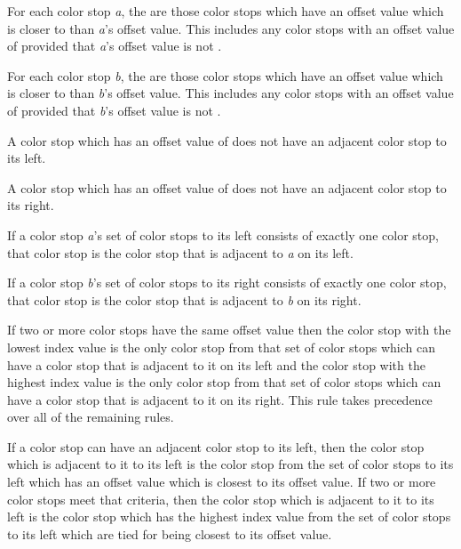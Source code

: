 \begin{enumeratea}
\item For each color stop \textit{a}, the  are those color stops which have an offset value which is closer to  than \textit{a}'s offset value.
\enternote
This includes any color stops with an offset value of  provided that \textit{a}'s offset value is not .
\exitnote

\item For each color stop \textit{b}, the  are those color stops which have an offset value which is closer to  than \textit{b}'s offset value.
\enternote
This includes any color stops with an offset value of  provided that \textit{b}'s offset value is not .
\exitnote

\item A color stop which has an offset value of  does not have an adjacent color stop to its left.

\item A color stop which has an offset value of  does not have an adjacent color stop to its right.

\item If a color stop \textit{a}'s set of color stops to its left consists of exactly one color stop, that color stop is the color stop that is adjacent to \textit{a} on its left.

\item If a color stop \textit{b}'s set of color stops to its right consists of exactly one color stop, that color stop is the color stop that is adjacent to \textit{b} on its right.

\item If two or more color stops have the same offset value then the color stop with the lowest index value is the only color stop from that set of color stops which can have a color stop that is adjacent to it on its left and the color stop with the highest index value is the only color stop from that set of color stops which can have a color stop that is adjacent to it on its right. This rule takes precedence over all of the remaining rules.

\item If a color stop can have an adjacent color stop to its left, then the color stop which is adjacent to it to its left is the color stop from the set of color stops to its left which has an offset value which is closest to its offset value. If two or more color stops meet that criteria, then the color stop which is adjacent to it to its left is the color stop which has the highest index value from the set of color stops to its left which are tied for being closest to its offset value.


\end{enumeratea}
